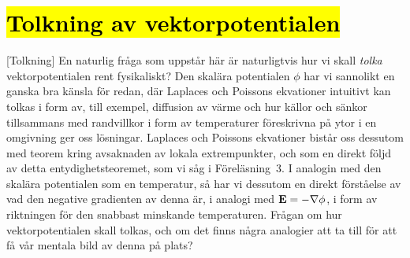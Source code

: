 {\section{{\hl{Tolkning av vektorpotentialen}}}
[Tolkning]
En naturlig fr{\aa}ga som uppst{\aa}r h{\"a}r {\"a}r naturligtvis hur vi skall
{\it tolka} vektorpotentialen rent fysika\-liskt? Den skal{\"a}ra potentialen
$\phi$ har vi sannolikt en ganska bra k{\"a}nsla f{\"o}r redan, d{\"a}r
Laplaces och Poissons ekvationer intuitivt kan tolkas i form av, till exempel,
diffusion av v{\"a}rme och hur k{\"a}llor och s{\"a}nkor tillsammans med
randvillkor i form av temperaturer f{\"o}reskrivna p{\aa} ytor i en omgivning
ger oss l{\"o}sningar.
Laplaces och Poissons ekvationer bist{\aa}r oss dessutom med teorem kring
avsaknaden av lokala extrempunkter, och som en direkt f{\"o}ljd av detta
entydighetsteoremet, som vi s{\aa}g i F{\"o}rel{\"a}sning~3.
I analogin med den skal{\"a}ra potentialen som en temperatur, s{\aa} har vi
dessutom en direkt f{\"o}rst{\aa}else av vad den negative gradienten av denna
{\"a}r, i analogi med ${\bf E}=-\nabla\phi$, i form av riktningen f{\"o}r den
snabbast minskande temperaturen.
Fr{\aa}gan om hur vektorpotentialen skall tolkas, och om det finns n{\aa}gra
analogier att ta till f{\"o}r att f{\aa} v{\aa}r mentala bild av denna p{\aa}
plats?

}
